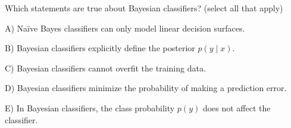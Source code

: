 Which statements are true about Bayesian classifiers? (select all that apply)


A) Naïve Bayes classifiers can only model linear decision surfaces.


B) Bayesian classifiers explicitly define the posterior \(p(y\mid x)\).


C) Bayesian classifiers cannot overfit the training data.


D) Bayesian classifiers minimize the probability of making a prediction error.


E) In Bayesian classifiers, the class probability \(p(y)\) does not affect the classifier.
